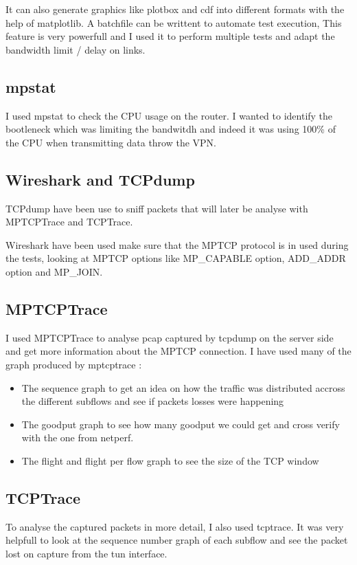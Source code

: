   It can also generate graphics like plotbox and cdf into different formats with the help of matplotlib. A batchfile can be writtent to automate test execution,
  This feature is very powerfull and I used it to perform multiple tests and adapt the bandwidth limit / delay on links.

  \subsection{mpstat}

  I used mpstat to check the CPU usage on the router. I wanted to identify the bootleneck which was limiting the bandwitdh
  and indeed it was using 100\% of the CPU when transmitting data throw the VPN.

  \subsection{Wireshark and TCPdump}

  TCPdump have been use to sniff packets that will later be analyse with MPTCPTrace and TCPTrace.

  Wireshark have been used make sure that the MPTCP protocol is in used during the tests,
  looking at MPTCP options like MP\_CAPABLE option, ADD\_ADDR option and MP\_JOIN.

  \subsection{MPTCPTrace \autocite{Hesmans:2014:TMT:2619239.2631453}}

  I used MPTCPTrace to analyse pcap captured by tcpdump on the server side and get more information about the MPTCP connection.
  I have used many of the graph produced by mptcptrace :

  \begin{itemize}
    \item The sequence graph to get an idea on how the traffic was distributed accross the different subflows and see if packets losses were happening
    \item The goodput graph to see how many goodput we could get and cross verify with the one from netperf.
    \item The flight and flight per flow graph to see the size of the TCP window
  \end{itemize}

  \subsection{TCPTrace \autocite{tcptrace}}

  To analyse the captured packets in more detail, I also used tcptrace. It was very helpfull to look at the sequence number graph of each subflow and
  see the packet lost on capture from the tun interface.
